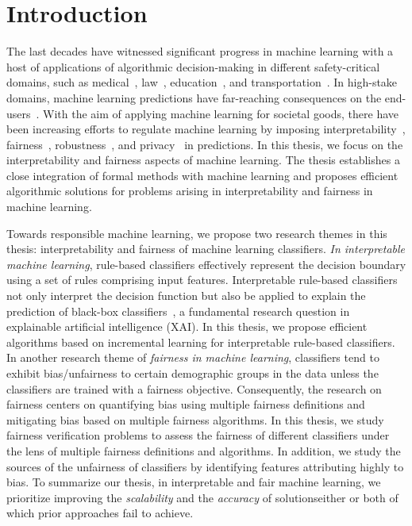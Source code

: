 \chapter{Introduction}
The last decades have witnessed significant progress in machine learning with a host of applications of algorithmic decision-making in different safety-critical domains, such as medical~\cite{erickson2017machine,kaissis2020secure,kononenko2001machine}, law~\cite{kumar2018law,surden2014machine}, education~\cite{luckin2018machine}, and transportation~\cite{peled2019model,zantalis2019review}. In high-stake domains,  machine learning predictions have far-reaching consequences on the end-users~\cite{eshete2021making}. With the aim of applying machine learning for societal goods, there have been increasing efforts to regulate machine learning by imposing interpretability~\cite{rudin2019stop}, fairness~\cite{barocas2017fairness}, robustness~\cite{rauber2017foolbox}, and privacy~\cite{papernot2016towards} in predictions. In this thesis, we focus on the interpretability and fairness aspects of machine learning. The thesis establishes a close integration of formal methods with machine learning and proposes efficient algorithmic solutions for problems arising in interpretability and fairness in machine learning.

Towards responsible machine learning, we propose two research themes in this thesis: interpretability and fairness of machine learning classifiers. \emph{In interpretable machine learning}, rule-based classifiers effectively represent the decision boundary using a set of rules comprising input features. Interpretable rule-based classifiers not only interpret the decision function but also be applied to explain the prediction of black-box classifiers~\cite{gill2020responsible,lundberg2017unified,moradi2021post,ribeiro2016should,slack2020fooling}, a fundamental research question in explainable artificial intelligence (XAI). In this thesis, we propose efficient algorithms based on incremental learning for interpretable rule-based classifiers. In another research theme of \emph{fairness in machine learning}, classifiers tend to exhibit bias/unfairness to certain demographic groups in the data unless the classifiers are trained with a fairness objective. Consequently, the research on fairness centers on quantifying bias using multiple fairness definitions and mitigating bias based on multiple fairness algorithms. In this thesis, we study fairness verification problems to assess the fairness of different classifiers under the lens of multiple fairness definitions and algorithms. In addition, we study the sources of the unfairness of classifiers by identifying  features attributing highly to bias. To summarize our thesis, in interpretable and fair machine learning, we prioritize improving the \emph{scalability} and the \emph{accuracy} of solutions\textemdash either or both of which prior approaches fail to achieve. 




